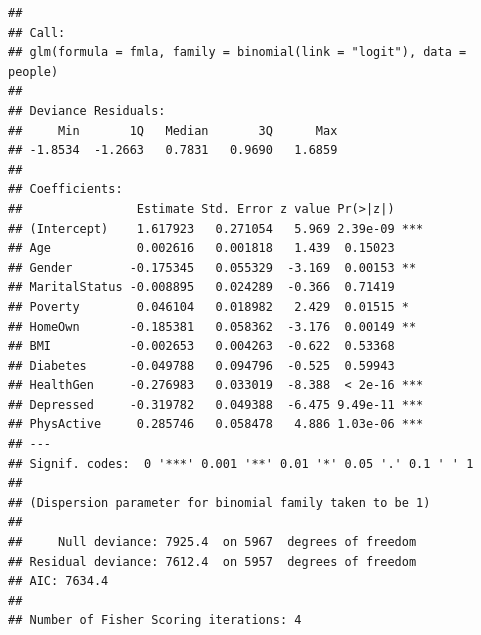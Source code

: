 \documentclass[]{article}
\newenvironment{Shaded}{\begin{snugshade}}{\end{snugshade}}
\newcommand{\KeywordTok}[1]{\textcolor[rgb]{0.13,0.29,0.53}{\textbf{{#1}}}}
\newcommand{\DataTypeTok}[1]{\textcolor[rgb]{0.13,0.29,0.53}{{#1}}}
\newcommand{\StringTok}[1]{\textcolor[rgb]{0.31,0.60,0.02}{{#1}}}
\newcommand{\CommentTok}[1]{\textcolor[rgb]{0.56,0.35,0.01}{\textit{{#1}}}}
\newcommand{\NormalTok}[1]{{#1}}
\begin{document}
\begin{verbatim}
## 
## Call:
## glm(formula = fmla, family = binomial(link = "logit"), data = people)
## 
## Deviance Residuals: 
##     Min       1Q   Median       3Q      Max  
## -1.8534  -1.2663   0.7831   0.9690   1.6859  
## 
## Coefficients:
##                Estimate Std. Error z value Pr(>|z|)    
## (Intercept)    1.617923   0.271054   5.969 2.39e-09 ***
## Age            0.002616   0.001818   1.439  0.15023    
## Gender        -0.175345   0.055329  -3.169  0.00153 ** 
## MaritalStatus -0.008895   0.024289  -0.366  0.71419    
## Poverty        0.046104   0.018982   2.429  0.01515 *  
## HomeOwn       -0.185381   0.058362  -3.176  0.00149 ** 
## BMI           -0.002653   0.004263  -0.622  0.53368    
## Diabetes      -0.049788   0.094796  -0.525  0.59943    
## HealthGen     -0.276983   0.033019  -8.388  < 2e-16 ***
## Depressed     -0.319782   0.049388  -6.475 9.49e-11 ***
## PhysActive     0.285746   0.058478   4.886 1.03e-06 ***
## ---
## Signif. codes:  0 '***' 0.001 '**' 0.01 '*' 0.05 '.' 0.1 ' ' 1
## 
## (Dispersion parameter for binomial family taken to be 1)
## 
##     Null deviance: 7925.4  on 5967  degrees of freedom
## Residual deviance: 7612.4  on 5957  degrees of freedom
## AIC: 7634.4
## 
## Number of Fisher Scoring iterations: 4
\end{verbatim}

\begin{Shaded}
\end{Shaded}
\end{document}
